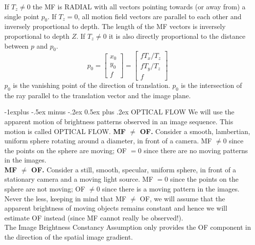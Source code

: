 \documentclass[10pt,landscape]{article}
\makeatletter
\renewcommand{\subsection}{\@startsection{subsection}{2}{0mm}%
                                {-1explus -.5ex minus -.2ex}%
                                {0.5ex plus .2ex}%
                                {\normalfont\normalsize\bfseries}}
\makeatother
\begin{document}
\begin{multicols}{3}
If $T_z\neq 0$ the MF is RADIAL with all vectors pointing towards (or away from) a single point $p_0$.
If $T_z = 0$, all motion field vectors are parallel to each other and inversely proportional to depth. 
The length of the MF vectors is inversely proportional to depth $Z$.
If $T_z \neq 0$ it is also directly proportional to the distance between $p$ and $p_0$.
\begin{equation*}
    p_0 = \left[ \begin{array}{c}
         x_0 \\
         y_0\\
         f
    \end{array}\right]= \left[ \begin{array}{c}
         fT_x/T_z \\
         fT_y/T_z\\
         f
    \end{array}\right]
\end{equation*}
$p_0$ is the vanishing point of the direction of translation.
$p_0$ is the intersection of the ray parallel to the translation vector and the image plane.


\subsection{OPTICAL FLOW}
We will use the apparent motion of brightness patterns observed in an image sequence. This motion is called OPTICAL FLOW.
\textbf{MF $\neq$ OF.} Consider a smooth, lambertian, uniform sphere rotating around a diameter, in front of a camera. MF $\neq 0$ since the points on the sphere are moving; OF $= 0$ since there are no moving patterns in the images. \\
\textbf{MF $\neq$ OF.} Consider a still, smooth, specular, uniform sphere, in front of a stationary camera and a moving light source. MF $= 0$ since the points on the sphere are not moving; OF $\neq 0$  since there is a moving pattern in the images. \\
Never the less, keeping in mind that MF $\neq$ OF, we will assume that the apparent brightness of moving objects remains constant and hence we will estimate OF instead (since MF cannot really be observed!).\\
The Image Brightness Constancy Assumption only provides the OF component in the direction of the spatial image gradient.

\end{multicols}
\end{document}

